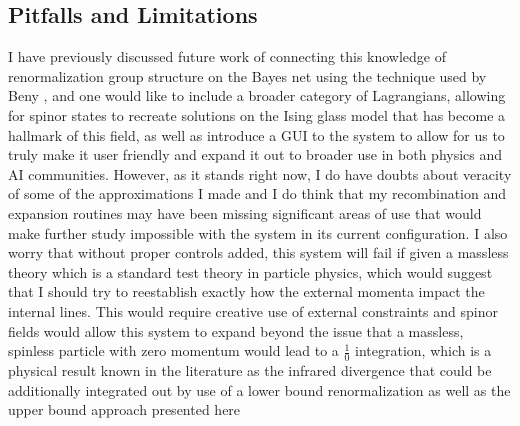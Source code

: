 \documentclass{article}
\begin{document}
\subsection{Pitfalls and Limitations}
I have previously discussed future work of connecting this knowledge of renormalization group structure on the Bayes net using the technique used by Beny \cite{Beny2013}, and one would like to include a broader category of Lagrangians, allowing for spinor states to recreate solutions on the Ising glass model that has become a hallmark of this field, as well as introduce a GUI to the system to allow for us to truly make it user friendly and expand it out to broader use in both physics and AI communities. 
However, as it stands right now, I do have doubts about veracity of some of the approximations I made and I do think that my recombination and expansion routines may have been missing significant areas of use that would make further study impossible with the system in its current configuration. I also worry that without proper controls added, this system will fail if given a massless theory which is a standard test theory in particle physics, which would suggest that I should try to reestablish exactly how the external momenta impact the internal lines. This would require creative use of external constraints and spinor fields would allow this system to expand beyond the issue that a massless, spinless particle with zero momentum would lead to a $\frac{1}{0}$ integration, which is a physical result known in the literature as the infrared divergence that could be additionally integrated out by use of a lower bound renormalization as well as the upper bound approach presented here


\end{document}
